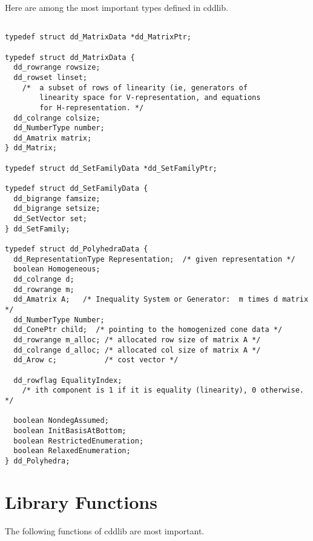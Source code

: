 \documentclass[11pt]{article}
\newcommand {\0} {{\bf 0}}
\begin{document}
Here are among the most important types defined in cddlib.

\begin{verbatim}

typedef struct dd_MatrixData *dd_MatrixPtr;

typedef struct dd_MatrixData {
  dd_rowrange rowsize;
  dd_rowset linset; 
    /*  a subset of rows of linearity (ie, generators of
        linearity space for V-representation, and equations
        for H-representation. */
  dd_colrange colsize;
  dd_NumberType number;
  dd_Amatrix matrix;  
} dd_Matrix;

typedef struct dd_SetFamilyData *dd_SetFamilyPtr;

typedef struct dd_SetFamilyData {
  dd_bigrange famsize;
  dd_bigrange setsize;
  dd_SetVector set;  
} dd_SetFamily;

typedef struct dd_PolyhedraData {
  dd_RepresentationType Representation;  /* given representation */
  boolean Homogeneous;
  dd_colrange d;
  dd_rowrange m;
  dd_Amatrix A;   /* Inequality System or Generator:  m times d matrix */
  dd_NumberType Number;
  dd_ConePtr child;  /* pointing to the homogenized cone data */
  dd_rowrange m_alloc; /* allocated row size of matrix A */
  dd_colrange d_alloc; /* allocated col size of matrix A */
  dd_Arow c;           /* cost vector */

  dd_rowflag EqualityIndex;  
    /* ith component is 1 if it is equality (linearity), 0 otherwise. */

  boolean NondegAssumed;
  boolean InitBasisAtBottom;
  boolean RestrictedEnumeration;
  boolean RelaxedEnumeration;
} dd_Polyhedra;

\end{verbatim}

\section{Library Functions}  \label{LIBRARY}

The following functions of cddlib are most important. 
\end{document}
